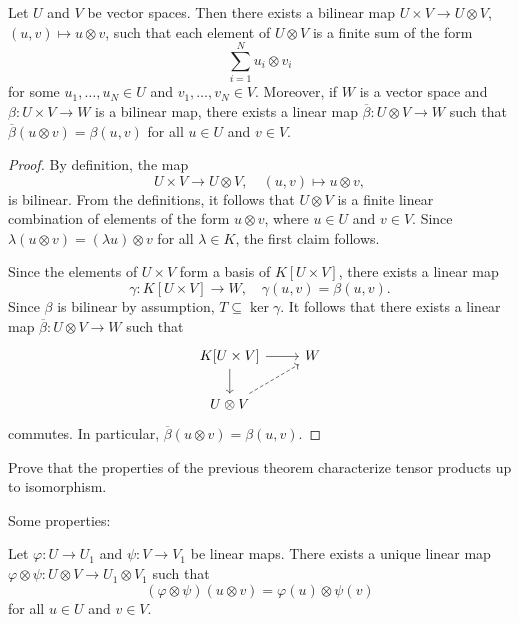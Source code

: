\begin{theorem}
	Let $U$ and $V$ be vector spaces. Then there exists a bilinear map 
	$U\times V\to U\otimes V$, $(u,v)\mapsto u\otimes v$, such that 
	each element of $U\otimes V$ is a finite sum of the form 
	\[
		\sum_{i=1}^N u_i\otimes v_i
	\]
	for some $u_1,\dots,u_N\in U$ and $v_1,\dots,v_N\in V$. 
	Moreover, if $W$ is a vector space and $\beta\colon U\times V\to W$ is a bilinear map, 
	there exists a linear map 
	$\overline{\beta}\colon U\otimes V\to W$ such that $\overline{\beta}(u\otimes
	v)=\beta(u,v)$ for all $u\in U$ and $v\in V$.
\end{theorem}

\begin{proof}
    By definition, the map
    \[
	U\times V\to U\otimes V,\quad
	(u,v)\mapsto u\otimes v,
	\]
	is bilinear. From the definitions, it follows that
	$U\otimes V$ is a finite linear combination of elements of the form 
	$u\otimes v$, where $u\in U$ and $v\in V$. Since $\lambda(u\otimes
	v)=(\lambda u)\otimes v$ for all $\lambda\in K$, the first claim follows.

	Since the elements of $U\times V$ form a basis of $K[U\times V]$, there exists
	a linear map 
	\[
		\gamma\colon K[U\times V]\to W,\quad
	\gamma(u,v)=\beta(u,v). 
	\]
	Since $\beta$ is bilinear by assumption, $T\subseteq\ker\gamma$. It follows that there exists 
	a linear map $\overline{\beta}\colon U\otimes V\to
	W$ such that  
	\[
	\begin{tikzcd}
		K[U\times V] \arrow[r]\arrow[d] & W \\
		U\otimes V\arrow[ur, dashrightarrow]
	\end{tikzcd}
	\]
	commutes. In particular, $\overline{\beta}(u\otimes v)=\beta(u,v)$. 
\end{proof}

\begin{exercise}
	\label{xca:tensorial_unicidad}
	Prove that the properties of the previous theorem characterize tensor products up to isomorphism. 
\end{exercise}

Some properties:

\begin{proposition}
	Let $\varphi\colon U\to U_1$ and $\psi\colon V\to V_1$ be linear maps. There
	exists a unique linear map 
	$\varphi\otimes\psi\colon U\otimes V\to U_1\otimes V_1$ such that
	\[
		(\varphi\otimes\psi)(u\otimes v)=\varphi(u)\otimes\psi(v)
	\]
	for all $u\in U$ and $v\in V$.
\end{proposition}

